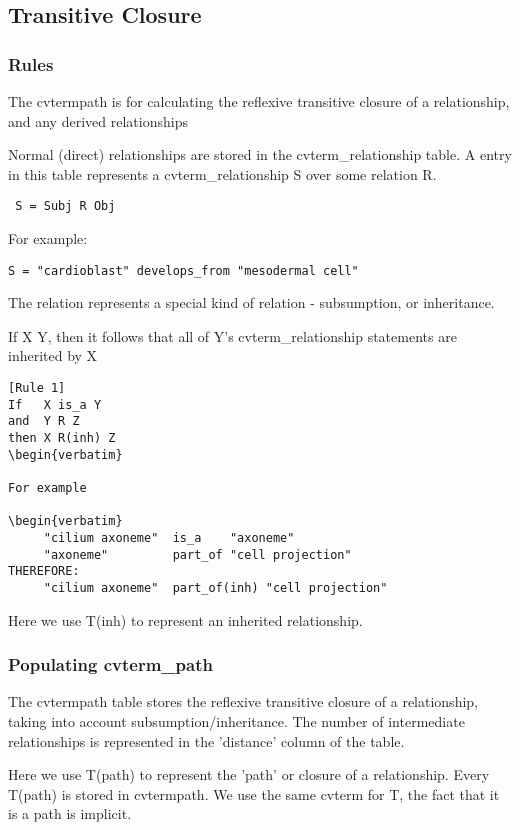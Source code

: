 \subsection{Transitive Closure}

\subsubsection{Rules}

The cvtermpath is for calculating the reflexive transitive closure of
a relationship, and any derived relationships

Normal (direct) relationships are stored in the cvterm_relationship
table. A entry in this table represents a cvterm_relationship S over
some relation R.

\begin{verbatim}
 S = Subj R Obj
\end{verbatim}

For example:

 {\tt S = "cardioblast" develops_from "mesodermal cell"}

The relation \isa represents a special kind of relation -
subsumption, or inheritance.

If X \isa Y, then it follows that all of Y's cvterm\_relationship
statements are inherited by X

\begin{verbatim}
[Rule 1]
If   X is_a Y
and  Y R Z
then X R(inh) Z
\begin{verbatim}

For example

\begin{verbatim}
     "cilium axoneme"  is_a    "axoneme"
     "axoneme"         part_of "cell projection"
THEREFORE:
     "cilium axoneme"  part_of(inh) "cell projection"
\end{verbatim}

Here we use T(inh) to represent an inherited relationship.

\subsubsection{Populating cvterm\_path}

The cvtermpath table stores the reflexive transitive closure of a
relationship, taking into account subsumption/inheritance. The number
of intermediate relationships is represented in the 'distance' column
of the table.

Here we use T(path) to represent the 'path' or closure of a
relationship. Every T(path) is stored in cvtermpath. We use the same
cvterm for T, the fact that it is a path is implicit.

